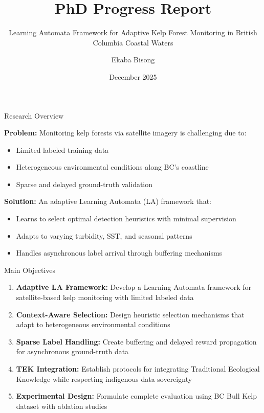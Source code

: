 \documentclass[10pt,xcolor={table,dvipsnames},t]{beamer}
\title[PhD Progress Report]{PhD Progress Report}
\subtitle{Learning Automata Framework for Adaptive Kelp Forest Monitoring in British Columbia Coastal Waters}
\author{Ekaba Bisong}
\institute{Department of Computer Science\\University of Victoria}
\date{December 2025}
\begin{document}
\begin{frame}
  \titlepage
\end{frame}

\begin{frame}{Research Overview}

\textbf{Problem:} Monitoring kelp forests via satellite imagery is challenging due to:
\begin{itemize}
  \item Limited labeled training data
  \item Heterogeneous environmental conditions along BC's coastline
  \item Sparse and delayed ground-truth validation
\end{itemize}

\vspace{0.5em}
\textbf{Solution:} An adaptive Learning Automata (LA) framework that:
\begin{itemize}
  \item Learns to select optimal detection heuristics with minimal supervision
  \item Adapts to varying turbidity, SST, and seasonal patterns
  \item Handles asynchronous label arrival through buffering mechanisms
\end{itemize}

\end{frame}

\begin{frame}{Main Objectives}

\begin{enumerate}
  \item \textbf{Adaptive LA Framework:} Develop a Learning Automata framework for satellite-based kelp monitoring with limited labeled data

  \item \textbf{Context-Aware Selection:} Design heuristic selection mechanisms that adapt to heterogeneous environmental conditions

  \item \textbf{Sparse Label Handling:} Create buffering and delayed reward propagation for asynchronous ground-truth data

  \item \textbf{TEK Integration:} Establish protocols for integrating Traditional Ecological Knowledge while respecting indigenous data sovereignty

  \item \textbf{Experimental Design:} Formulate complete evaluation using BC Bull Kelp dataset with ablation studies
\end{enumerate}

\end{frame}
\end{document}
